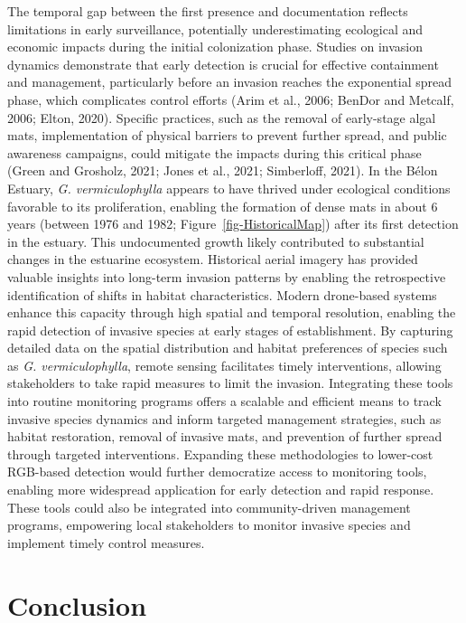 \documentclass[
  letterpaper,
  DIV=11,
  numbers=noendperiod]{scrartcl}
\begin{document}
The temporal gap between the first presence and documentation reflects
limitations in early surveillance, potentially underestimating
ecological and economic impacts during the initial colonization phase.
Studies on invasion dynamics demonstrate that early detection is crucial
for effective containment and management, particularly before an
invasion reaches the exponential spread phase, which complicates control
efforts (Arim et al., 2006; BenDor and Metcalf, 2006; Elton, 2020).
Specific practices, such as the removal of early-stage algal mats,
implementation of physical barriers to prevent further spread, and
public awareness campaigns, could mitigate the impacts during this
critical phase (Green and Grosholz, 2021; Jones et al., 2021;
Simberloff, 2021). In the Bélon Estuary, \emph{G. vermiculophylla}
appears to have thrived under ecological conditions favorable to its
proliferation, enabling the formation of dense mats in about 6 years
(between 1976 and 1982; Figure~\ref{fig-HistoricalMap}) after its first
detection in the estuary. This undocumented growth likely contributed to
substantial changes in the estuarine ecosystem. Historical aerial
imagery has provided valuable insights into long-term invasion patterns
by enabling the retrospective identification of shifts in habitat
characteristics. Modern drone-based systems enhance this capacity
through high spatial and temporal resolution, enabling the rapid
detection of invasive species at early stages of establishment. By
capturing detailed data on the spatial distribution and habitat
preferences of species such as \emph{G. vermiculophylla}, remote sensing
facilitates timely interventions, allowing stakeholders to take rapid
measures to limit the invasion. Integrating these tools into routine
monitoring programs offers a scalable and efficient means to track
invasive species dynamics and inform targeted management strategies,
such as habitat restoration, removal of invasive mats, and prevention of
further spread through targeted interventions. Expanding these
methodologies to lower-cost RGB-based detection would further
democratize access to monitoring tools, enabling more widespread
application for early detection and rapid response. These tools could
also be integrated into community-driven management programs, empowering
local stakeholders to monitor invasive species and implement timely
control measures.

\section{Conclusion}\label{conclusion}
\end{document}
